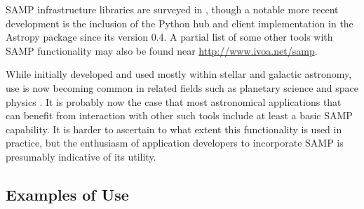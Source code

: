 \documentclass[5p]{elsarticle}
\begin{document}
SAMP infrastructure libraries are surveyed in \citet{adassxxii_bof},
though a notable more recent development is the inclusion of the Python
hub and client implementation in the Astropy package
\citep{2013A&A...558A..33A} since its version 0.4.
A partial list of some other tools with SAMP functionality
may also be found near \url{http://www.ivoa.net/samp}.

While initially developed and used mostly
within stellar and galactic astronomy,
use is now becoming common in related fields such as
planetary science \citep{ACVOplanetary}
and space physics \citep{ACVOspacephys}.
It is probably now the case that most astronomical applications
that can benefit from interaction with other such tools
include at least a basic SAMP capability.
It is harder to ascertain to what extent this functionality is used
in practice, but the enthusiasm of application developers to
incorporate SAMP is presumably indicative of its utility.

\subsection{Examples of Use} \label{sec:examples}
\end{document}
